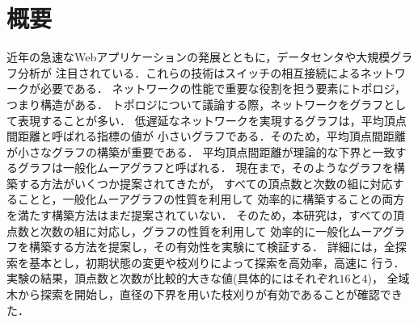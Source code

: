 
\chapter*{概要}
近年の急速なWebアプリケーションの発展とともに，データセンタや大規模グラフ分析が
注目されている．これらの技術はスイッチの相互接続によるネットワークが必要である．
ネットワークの性能で重要な役割を担う要素にトポロジ，つまり構造がある．
トポロジについて議論する際，ネットワークをグラフとして表現することが多い．
低遅延なネットワークを実現するグラフは，平均頂点間距離と呼ばれる指標の値が
小さいグラフである．そのため，平均頂点間距離が小さなグラフの構築が重要である．
平均頂点間距離が理論的な下界と一致するグラフは一般化ムーアグラフと呼ばれる．
現在まで，そのようなグラフを構築する方法がいくつか提案されてきたが，
すべての頂点数と次数の組に対応することと，一般化ムーアグラフの性質を利用して
効率的に構築することの両方を満たす構築方法はまだ提案されていない．
そのため，本研究は，すべての頂点数と次数の組に対応し，グラフの性質を利用して
効率的に一般化ムーアグラフを構築する方法を提案し，その有効性を実験にて検証する．
詳細には，全探索を基本とし，初期状態の変更や枝刈りによって探索を高効率，高速に
行う．実験の結果，頂点数と次数が比較的大きな値(具体的にはそれぞれ$16$と$4$)，
全域木から探索を開始し，直径の下界を用いた枝刈りが有効であることが確認できた．

\begin{comment}
\begingroup
\renewcommand{\cleardoublepage}{}
\renewcommand{\clearpage}{}
\chapter*{Abstract}
\endgroup
In recent years, 

\end{comment}
